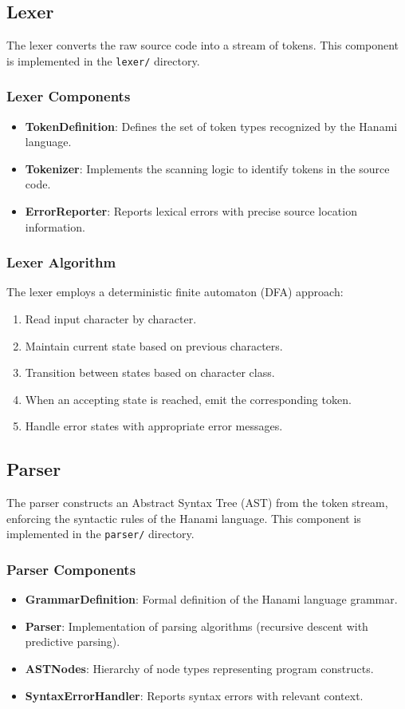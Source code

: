 \documentclass[conference]{IEEEtran}
\begin{document}
\subsection{Lexer}
The lexer converts the raw source code into a stream of tokens. This component is implemented in the \texttt{lexer/} directory.

\subsubsection{Lexer Components}
\begin{itemize}
    \item \textbf{TokenDefinition}: Defines the set of token types recognized by the Hanami language.
    \item \textbf{Tokenizer}: Implements the scanning logic to identify tokens in the source code.
    \item \textbf{ErrorReporter}: Reports lexical errors with precise source location information.
\end{itemize}

\subsubsection{Lexer Algorithm}
The lexer employs a deterministic finite automaton (DFA) approach:
\begin{enumerate}
    \item Read input character by character.
    \item Maintain current state based on previous characters.
    \item Transition between states based on character class.
    \item When an accepting state is reached, emit the corresponding token.
    \item Handle error states with appropriate error messages.
\end{enumerate}

\subsection{Parser}
The parser constructs an Abstract Syntax Tree (AST) from the token stream, enforcing the syntactic rules of the Hanami language. This component is implemented in the \texttt{parser/} directory.

\subsubsection{Parser Components}
\begin{itemize}
    \item \textbf{GrammarDefinition}: Formal definition of the Hanami language grammar.
    \item \textbf{Parser}: Implementation of parsing algorithms (recursive descent with predictive parsing).
    \item \textbf{ASTNodes}: Hierarchy of node types representing program constructs.
    \item \textbf{SyntaxErrorHandler}: Reports syntax errors with relevant context.
\end{itemize}
\end{document}
